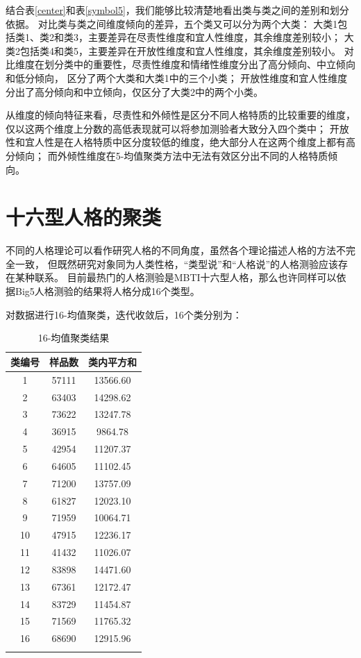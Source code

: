 \documentclass[UTF8]{ctexart}
\begin{document}
结合表\ref{center}和表\ref{symbol5}，我们能够比较清楚地看出类与类之间的差别和划分依据。
对比类与类之间维度倾向的差异，五个类又可以分为两个大类：
大类1包括类1、类2和类3，主要差异在尽责性维度和宜人性维度，其余维度差别较小；
大类2包括类4和类5，主要差异在开放性维度和宜人性维度，其余维度差别较小。
对比维度在划分类中的重要性，尽责性维度和情绪性维度分出了高分倾向、中立倾向和低分倾向，
区分了两个大类和大类1中的三个小类；
开放性维度和宜人性维度分出了高分倾向和中立倾向，仅区分了大类2中的两个小类。\par
从维度的倾向特征来看，尽责性和外倾性是区分不同人格特质的比较重要的维度，
仅以这两个维度上分数的高低表现就可以将参加测验者大致分入四个类中；
开放性和宜人性是在人格特质中区分度较低的维度，绝大部分人在这两个维度上都有高分倾向；
而外倾性维度在5-均值聚类方法中无法有效区分出不同的人格特质倾向。
\section{十六型人格的聚类}
不同的人格理论可以看作研究人格的不同角度，虽然各个理论描述人格的方法不完全一致，
但既然研究对象同为人类性格，“类型说”和“人格说”的人格测验应该存在某种联系。
目前最热门的人格测验是MBTI十六型人格，那么也许同样可以依据Big5人格测验的结果将人格分成16个类型。\par
对数据进行16-均值聚类，迭代收敛后，16个类分别为：
\begin{longtable}{c|c|c}
  \hline
  类编号 & 样品数   & 类内平方和    \\\hline
  1   & 57111 & 13566.60 \\\hline
  2   & 63403 & 14298.62 \\\hline
  3   & 73622 & 13247.78 \\\hline
  4   & 36915 & 9864.78  \\\hline
  5   & 42954 & 11207.37 \\\hline
  6   & 64605 & 11102.45 \\\hline
  7   & 71200 & 13757.09 \\\hline
  8   & 61827 & 12023.10 \\\hline
  9   & 71959 & 10064.71 \\\hline
  10  & 47915 & 12236.17 \\\hline
  11  & 41432 & 11026.07 \\\hline
  12  & 83898 & 14471.60 \\\hline
  13  & 67361 & 12172.47 \\\hline
  14  & 83729 & 11454.87 \\\hline
  15  & 71569 & 11765.32 \\\hline
  16  & 68690 & 12915.96 \\\hline
  \caption{16-均值聚类结果}
\end{longtable}
\end{document}
